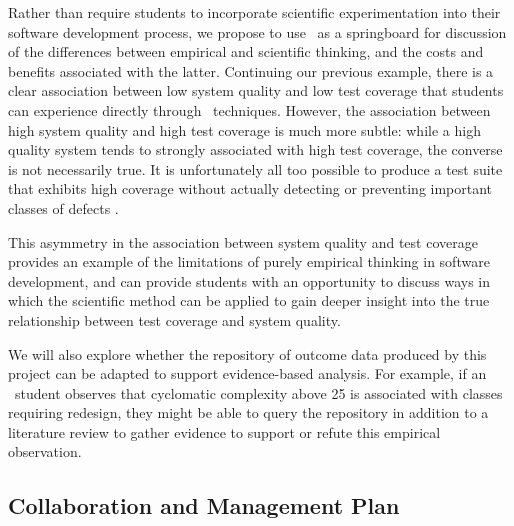 Rather than require students to incorporate scientific experimentation into
their software development process, we propose to use \eCT\ as a
springboard for discussion of the differences between empirical and
scientific thinking, and the costs and benefits associated with the latter.
Continuing our previous example, there is a clear association between low
system quality and low test coverage that students can experience directly
through \eCT\ techniques.  However, the association between high system
quality and high test coverage is much more subtle: while a high quality
system tends to strongly associated with high test coverage, the converse
is not necessarily true. It is unfortunately all too possible to produce a
test suite that exhibits high coverage without actually detecting or
preventing important classes of defects \citep{Marick99}.

This asymmetry in the association between system quality and test coverage
provides an example of the limitations of purely empirical thinking in
software development, and can provide students with an opportunity to discuss 
ways in which the scientific method can be applied to gain deeper insight into 
the true relationship between test coverage and system quality.  

We will also explore whether the repository of outcome data produced by
this project can be adapted to support evidence-based analysis. For
example, if an \eCT\ student observes that cyclomatic complexity above 25
is associated with classes requiring redesign, they might be able to query
the repository in addition to a literature review to gather
evidence to support or refute this empirical observation.


\subsection{Collaboration and Management Plan}




